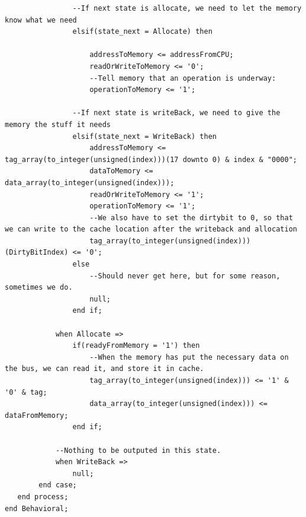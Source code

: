 \documentclass{article}
\begin{document}
\begin{lstlisting}
                --If next state is allocate, we need to let the memory know what we need
                elsif(state_next = Allocate) then
                                          
                    addressToMemory <= addressFromCPU;
                    readOrWriteToMemory <= '0';
                    --Tell memory that an operation is underway:
                    operationToMemory <= '1';
                    
                --If next state is writeBack, we need to give the memory the stuff it needs
                elsif(state_next = WriteBack) then
                    addressToMemory <= tag_array(to_integer(unsigned(index)))(17 downto 0) & index & "0000";
                    dataToMemory <= data_array(to_integer(unsigned(index)));
                    readOrWriteToMemory <= '1';
                    operationToMemory <= '1';
                    --We also have to set the dirtybit to 0, so that we can write to the cache location after the writeback and allocation
                    tag_array(to_integer(unsigned(index)))(DirtyBitIndex) <= '0';
                else
                    --Should never get here, but for some reason, sometimes we do.
                    null;
                end if;
                    
            when Allocate =>
                if(readyFromMemory = '1') then
                    --When the memory has put the necessary data on the bus, we can read it, and store it in cache.
                    tag_array(to_integer(unsigned(index))) <= '1' & '0' & tag;
                    data_array(to_integer(unsigned(index))) <= dataFromMemory;
                end if;
                
            --Nothing to be outputed in this state. 
            when WriteBack =>
                null;
        end case;
   end process;
end Behavioral;

\end{lstlisting}
\end{document}
